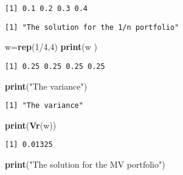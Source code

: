 \documentclass[]{article}
\newenvironment{Shaded}{\begin{snugshade}}{\end{snugshade}}
\newcommand{\KeywordTok}[1]{\textcolor[rgb]{0.13,0.29,0.53}{\textbf{{#1}}}}
\newcommand{\DataTypeTok}[1]{\textcolor[rgb]{0.13,0.29,0.53}{{#1}}}
\newcommand{\DecValTok}[1]{\textcolor[rgb]{0.00,0.00,0.81}{{#1}}}
\newcommand{\StringTok}[1]{\textcolor[rgb]{0.31,0.60,0.02}{{#1}}}
\newcommand{\NormalTok}[1]{{#1}}
\begin{document}
\begin{verbatim}
[1] 0.1 0.2 0.3 0.4
\end{verbatim}

\begin{Shaded}
\end{Shaded}

\begin{verbatim}
[1] "The solution for the 1/n portfolio"
\end{verbatim}

\begin{Shaded}
\begin{Highlighting}[]
\NormalTok{w=}\KeywordTok{rep}\NormalTok{(}\DecValTok{1}\NormalTok{/}\DecValTok{4}\NormalTok{,}\DecValTok{4}\NormalTok{)}
\KeywordTok{print}\NormalTok{(w )}
\end{Highlighting}
\end{Shaded}

\begin{verbatim}
[1] 0.25 0.25 0.25 0.25
\end{verbatim}

\begin{Shaded}
\begin{Highlighting}[]
\KeywordTok{print}\NormalTok{(}\StringTok{"The variance"}\NormalTok{)}
\end{Highlighting}
\end{Shaded}

\begin{verbatim}
[1] "The variance"
\end{verbatim}

\begin{Shaded}
\begin{Highlighting}[]
\KeywordTok{print}\NormalTok{(}\KeywordTok{Vr}\NormalTok{(w))}
\end{Highlighting}
\end{Shaded}

\begin{verbatim}
[1] 0.01325
\end{verbatim}

\begin{Shaded}
\begin{Highlighting}[]
\KeywordTok{print}\NormalTok{(}\StringTok{"The solution for the MV portfolio"}\NormalTok{)}
\end{Highlighting}
\end{Shaded}
\end{document}
